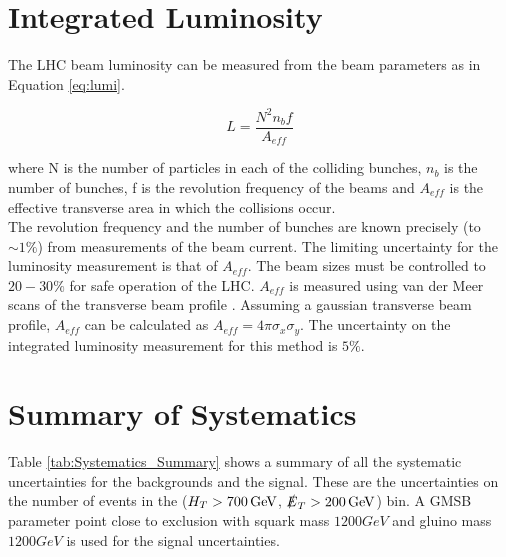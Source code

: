 \section{Integrated Luminosity}

The LHC beam luminosity can be measured from the beam parameters as in Equation
\ref{eq:lumi}.

\begin{equation}
L = \frac{N^{2}n_{b}f}{A_{eff}}
\label{eq:lumi}
\end{equation}

where N is the number of particles in each of the colliding bunches, $n_{b}$ is
the number of bunches, f is the revolution frequency of the beams and $A_{eff}$
is the effective transverse area in which the collisions occur. \\

The revolution frequency and the number of bunches are known precisely (to $\sim
1\unit{\%}$) from measurements of the beam current. The limiting uncertainty for 
the luminosity measurement is that of $A_{eff}$. The beam sizes must be 
controlled to $20-30\unit{\%}$ for safe operation of the LHC. $A_{eff}$ is 
measured using van der Meer scans of the transverse beam profile 
\cite{vdm_scans}. Assuming a gaussian transverse beam profile, $A_{eff}$ can be 
calculated as $A_{eff} = 4\pi\sigma_{x}\sigma_{y}$. The uncertainty on the 
integrated luminosity measurement for this method is $5\unit{\%}$. \\

\section{Summary of Systematics}

Table \ref{tab:Systematics_Summary} shows a summary of all the systematic
uncertainties for the backgrounds and the signal. These are the uncertainties on
the number of events in the ($H_{T}>700\, \mathrm{GeV}$, $\slashed{E}_{T}>200\, \mathrm{GeV}$) bin. A
GMSB parameter point close to exclusion with squark mass $1200\unit{GeV}$ and 
gluino mass $1200\unit{GeV}$ is used for the signal uncertainties.

